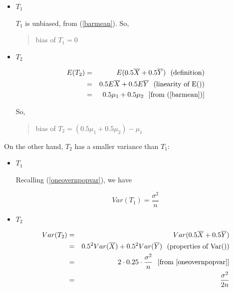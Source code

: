\begin{itemize}

\item $T_1$

$T_1$ is unbiased, from (\ref{barmean}).   So,

\begin{quote}
bias of $T_1 = 0$ 
\end{quote}

\item $T_2$ 

\begin{eqnarray}
E(T_2) &=& E(0.5 \overline{X} + 0.5 \overline{Y}) ~~ (\textrm{definition}) \\
&=& 0.5 E\overline{X} + 0.5 E\overline{Y} ~~ (\textrm{linearity of E()}) \\
&=& 0.5 \mu_1 + 0.5 \mu_2 ~~ [\textrm{from (\ref{barmean})}] 
\end{eqnarray}

So, 

\begin{quote}
bias of $T_2 = (0.5 \mu_1 + 0.5 \mu_2) - \mu_1$
\end{quote}

\end{itemize}

On the other hand, $T_2$ has a smaller variance than $T_1$:  

\begin{itemize}

\item $T_1$ 

Recalling
(\ref{oneovernpopvar}), we have

\begin{equation}
Var(T_1) = \frac{\sigma^2}{n}
\end{equation}

\item $T_2$ 

\begin{eqnarray}
Var(T_2) &=& Var(0.5 \overline{X} + 0.5 \overline{Y}) \\ 
&=& 0.5^2 Var(\overline{X}) + 0.5^2 Var(\overline{Y}) ~~ (\textrm{properties of
Var()}) \\
&=& 2 \cdot 0.25 \cdot \frac{\sigma^2}{n} ~~ [\textrm{from
\ref{oneovernpopvar}}] \label{t2var} \\
&=& \frac{\sigma^2}{2n}
\end{eqnarray}

\end{itemize}

